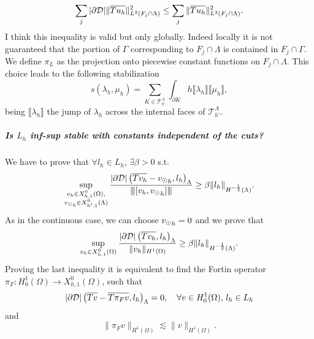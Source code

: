 \begin{equation*}
\sum _j |\partial\mathcal{D}| \|\overline{T u_h}\|^2_{L^2(F_j \cap \Lambda)} \leq \sum _j \|\overline{T u_h}\|^2_{L^2(F_j\cap \Lambda)}.
\end{equation*}
{\color{red} I think this inequality is valid but only globally. Indeed locally it is not guaranteed that the portion of $\Gamma$ corresponding to $F_j \cap \Lambda$ is contained in $F_j \cap \Gamma$}. \\
We define $\pi_L$ as the projection onto piecewise constant functions on $F_j\cap \Lambda$. This choice leads to the following stabilization 
\begin{equation*}
s(\lambda_h, \mu_h)= \sum _{K\in \mathcal{T}_{h'}^{\Lambda}} \int_{\partial K} h \llbracket \lambda_h \rrbracket \llbracket \mu_h \rrbracket,
\end{equation*}
being $\llbracket \lambda_h \rrbracket$ the jump of $\lambda_h$ across the internal faces of $\mathcal{T}_{h'}^{\Lambda}$.

\subparagraph{Is $L_h$ inf-sup stable with constants independent of the cuts?} We have to prove that $\forall l_h \in L_h$, $\exists \beta >0$ s.t.
\begin{equation*}
\sup_{\substack{v_h \in X_{h,1}^0(\Omega),\\ {v_{\odot}}_h \in X_{h',1}^0(\Lambda)}} \frac{|\partial\mathcal{D}|\left(\overline{T v_h} - {v_{\odot}}_h, l _h\right)_{\Lambda}}{{\left\vert\kern-0.25ex\left\vert\kern-0.25ex\left\vert [v_h, {v_{\odot}}_h] \right\vert\kern-0.25ex\right\vert\kern-0.25ex\right\vert}} \geq \beta \|l_h\|_{H^{-\frac 12}(\Lambda)}.
\end{equation*}
As in the continuous case, we can choose ${v_{\odot}}_h=0$ and we prove that
\begin{equation*} 
\sup_{v_h \in X_{h,1}^0(\Omega)} \frac{|\partial\mathcal{D}|\left(\overline{T v_h} , l _h\right)_{\Lambda}}{\|v_h\|_{H^1(\Omega)}} \geq \beta \|l_h\|_{H^{-\frac 12}(\Lambda)}.
\end{equation*} 
Proving the last inequality it is equivalent to find the Fortin operator $\pi_F: H^1_0(\Omega) \rightarrow X_{h,1}^0(\Omega)$, such that 
\begin{equation*}
|\partial\mathcal{D}|\left(\overline{T v} - \overline{T \pi _F v}  , l _h\right)_{\Lambda}=0, \quad \forall v\in H^1_0(\Omega), \, l_h \in L_h
\end{equation*} 
and
\begin{equation*}
\|\pi_F v\|_{H^1(\Omega)}\lesssim \|v\|_{H^1(\Omega)}.
\end{equation*} 

